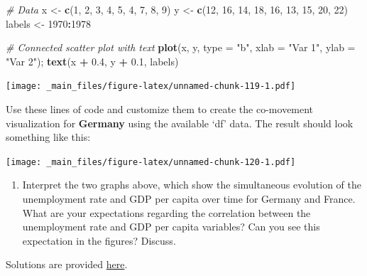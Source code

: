 \documentclass[
  12pt,
  oneside]{book}
\newenvironment{Shaded}{\begin{snugshade}}{\end{snugshade}}
\newcommand{\AttributeTok}[1]{\textcolor[rgb]{0.13,0.29,0.53}{#1}}
\newcommand{\CommentTok}[1]{\textcolor[rgb]{0.56,0.35,0.01}{\textit{#1}}}
\newcommand{\DecValTok}[1]{\textcolor[rgb]{0.00,0.00,0.81}{#1}}
\newcommand{\FloatTok}[1]{\textcolor[rgb]{0.00,0.00,0.81}{#1}}
\newcommand{\FunctionTok}[1]{\textcolor[rgb]{0.13,0.29,0.53}{\textbf{#1}}}
\newcommand{\NormalTok}[1]{#1}
\newcommand{\OtherTok}[1]{\textcolor[rgb]{0.56,0.35,0.01}{#1}}
\newcommand{\SpecialCharTok}[1]{\textcolor[rgb]{0.81,0.36,0.00}{\textbf{#1}}}
\newcommand{\StringTok}[1]{\textcolor[rgb]{0.31,0.60,0.02}{#1}}
\providecommand{\tightlist}{%
  \setlength{\itemsep}{0pt}\setlength{\parskip}{0pt}}
\begin{document}
\begin{Shaded}
\begin{Highlighting}[]
\CommentTok{\# Data}
\NormalTok{x }\OtherTok{\textless{}{-}} \FunctionTok{c}\NormalTok{(}\DecValTok{1}\NormalTok{, }\DecValTok{2}\NormalTok{, }\DecValTok{3}\NormalTok{, }\DecValTok{4}\NormalTok{, }\DecValTok{5}\NormalTok{, }\DecValTok{4}\NormalTok{, }\DecValTok{7}\NormalTok{, }\DecValTok{8}\NormalTok{, }\DecValTok{9}\NormalTok{)}
\NormalTok{y }\OtherTok{\textless{}{-}} \FunctionTok{c}\NormalTok{(}\DecValTok{12}\NormalTok{, }\DecValTok{16}\NormalTok{, }\DecValTok{14}\NormalTok{, }\DecValTok{18}\NormalTok{, }\DecValTok{16}\NormalTok{, }\DecValTok{13}\NormalTok{, }\DecValTok{15}\NormalTok{, }\DecValTok{20}\NormalTok{, }\DecValTok{22}\NormalTok{)}
\NormalTok{labels }\OtherTok{\textless{}{-}} \DecValTok{1970}\SpecialCharTok{:}\DecValTok{1978}

\CommentTok{\# Connected scatter plot with text}
\FunctionTok{plot}\NormalTok{(x, y, }\AttributeTok{type =} \StringTok{"b"}\NormalTok{, }\AttributeTok{xlab =} \StringTok{"Var 1"}\NormalTok{, }\AttributeTok{ylab =} \StringTok{"Var 2"}\NormalTok{); }\FunctionTok{text}\NormalTok{(x }\SpecialCharTok{+} \FloatTok{0.4}\NormalTok{, y }\SpecialCharTok{+} \FloatTok{0.1}\NormalTok{, labels) }
\end{Highlighting}
\end{Shaded}

\texttt{[image: \_main\_files/figure-latex/unnamed-chunk-119-1.pdf]}

Use these lines of code and customize them to create the co-movement visualization for \textbf{Germany} using the available `df' data.
The result should look something like this:

\texttt{[image: \_main\_files/figure-latex/unnamed-chunk-120-1.pdf]}

\begin{enumerate}
\def\labelenumi{(\arabic{enumi})}
\setcounter{enumi}{23}
\tightlist
\item
  Interpret the two graphs above, which show the simultaneous evolution of the unemployment rate and GDP per capita over time for Germany and France. What are your expectations regarding the correlation between the unemployment rate and GDP per capita variables? Can you see this expectation in the figures? Discuss.
\end{enumerate}

Solutions are provided \href{https://raw.githubusercontent.com/hubchev/courses/main/scr/exe_okun_solution.R}{here}.
\end{document}
